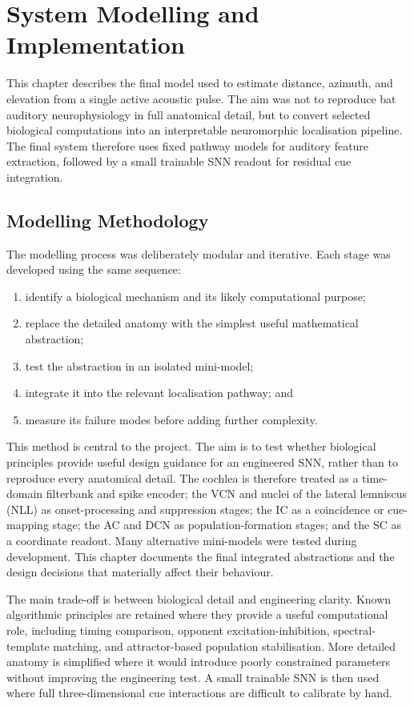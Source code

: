 \chapter{System Modelling and Implementation} \label{ch:modelling}

This chapter describes the final model used to estimate distance, azimuth, and elevation from a single active acoustic pulse. The aim was not to reproduce bat auditory neurophysiology in full anatomical detail, but to convert selected biological computations into an interpretable neuromorphic localisation pipeline. The final system therefore uses fixed pathway models for auditory feature extraction, followed by a small trainable SNN readout for residual cue integration.

\section{Modelling Methodology}

The modelling process was deliberately modular and iterative. Each stage was developed using the same sequence:
\begin{enumerate}
    \item identify a biological mechanism and its likely computational purpose;
    \item replace the detailed anatomy with the simplest useful mathematical abstraction;
    \item test the abstraction in an isolated mini-model;
    \item integrate it into the relevant localisation pathway; and
    \item measure its failure modes before adding further complexity.
\end{enumerate}

This method is central to the project. The aim is to test whether biological principles provide useful design guidance for an engineered SNN, rather than to reproduce every anatomical detail. The cochlea is therefore treated as a time-domain filterbank and spike encoder; the VCN and nuclei of the lateral lemniscus (NLL) as onset-processing and suppression stages; the IC as a coincidence or cue-mapping stage; the AC and DCN as population-formation stages; and the SC as a coordinate readout. Many alternative mini-models were tested during development. This chapter documents the final integrated abstractions and the design decisions that materially affect their behaviour.

The main trade-off is between biological detail and engineering clarity. Known algorithmic principles are retained where they provide a useful computational role, including timing comparison, opponent excitation-inhibition, spectral-template matching, and attractor-based population stabilisation. More detailed anatomy is simplified where it would introduce poorly constrained parameters without improving the engineering test. A small trainable SNN is then used where full three-dimensional cue interactions are difficult to calibrate by hand.

